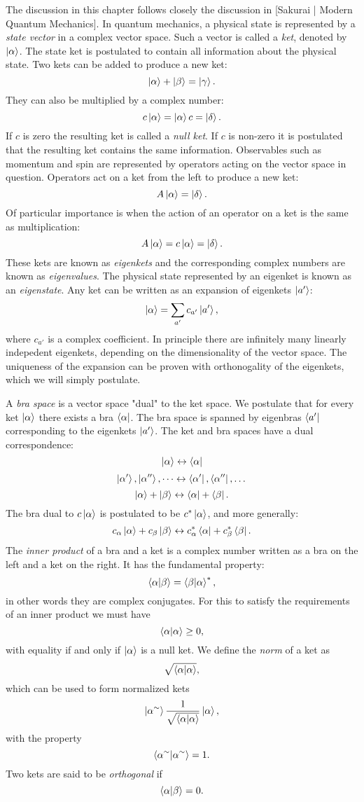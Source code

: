 The discussion in this chapter follows closely the discussion in
[Sakurai | Modern Quantum Mechanics].
\newline
In quantum mechanics, a physical state is represented by a \textit{state vector}
in a complex vector space. Such a vector is called a \textit{ket}, denoted
by $\ket{\alpha}$. The state ket is postulated to contain all information
about the physical state. Two kets can be added to produce a new ket:
$$ \ket{\alpha} + \ket{\beta} = \ket{\gamma} .$$
They can also be multiplied by a complex number:
$$ c\ket{\alpha} = \ket{\alpha}c = \ket{\delta} .$$
If $c$ is zero the resulting ket is called a \textit{null ket}.
If $c$ is non-zero it is postulated that the resulting ket contains
the same information.
\newline
Observables such as momentum and spin are represented by operators
acting on the vector space in question. Operators
act on a ket from the left to produce a new ket:
$$ A \ket{\alpha} = \ket{\delta} .$$
Of particular importance is when the action of an operator
on a ket is the same as multiplication:
$$ A \ket{\alpha} = c\ket{\alpha} = \ket{\delta} .$$
These kets are known as \textit{eigenkets} and the corresponding
complex numbers are known as \textit{eigenvalues}.
The physical state represented by an eigenket is known
as an \textit{eigenstate}. Any ket
can be written as an expansion of eigenkets $\ket{a'}$:
$$ \ket{\alpha} = \sum_{a'} c_{a'} \ket{a'} ,$$
where $c_{a'}$ is a complex coefficient. In principle
there are infinitely many linearly indepedent eigenkets,
depending on the dimensionality of the vector space.
The uniqueness of the expansion can be proven
with orthonogality of the eigenkets, which we will simply postulate.
\par
A \textit{bra space} is a vector space "dual" to the ket space.
We postulate that for every ket $\ket{\alpha}$ there exists a bra
$\bra{\alpha}$. The bra space is spanned by eigenbras $\bra{a'}$
corresponding to the eigenkets $\ket{a'}$. The ket and bra spaces
have a dual correspondence:
$$ \ket{\alpha} \leftrightarrow \bra{\alpha} $$
$$ \ket{\alpha '}, \ket{\alpha ''},\dots \leftrightarrow \bra{\alpha '}, \bra{\alpha ''},\dots $$
$$ \ket{\alpha} + \ket{\beta} \leftrightarrow \bra{\alpha} + \bra{\beta} .$$
The bra dual to $c \ket{\alpha}$ is postulated to be $c^* \ket{\alpha}$,
and more generally:
$$ c_{\alpha} \ket{\alpha} + c_{\beta} \ket{\beta} \leftrightarrow
c_{\alpha}^* \bra{\alpha} + c_{\beta}^* \bra{\beta} .$$
The \textit{inner product} of a bra and a ket is a complex number
written as a bra on the left and a ket on the right.
It has the fundamental property:
$$ \braket{\alpha | \beta} = \braket{\beta | \alpha}^* ,$$
in other words they are complex conjugates.
For this to satisfy the requirements of an inner product we must have
$$ \braket{\alpha | \alpha} \geq 0 ,$$
with equality if and only if $\ket{\alpha}$ is a null ket.
We define the \textit{norm} of a ket as
$$ \sqrt{\braket{\alpha | \alpha}} ,$$
which can be used to form normalized kets
$$ \ket{\alpha^{\sim}} \frac{1}{\sqrt{\braket{\alpha | \alpha}}} \ket{\alpha} ,$$
with the property
$$ \braket{\alpha^{\sim} | \alpha^{\sim}} = 1 .$$
Two kets are said to be \textit{orthogonal} if
$$ \braket{\alpha | \beta} = 0 .$$

